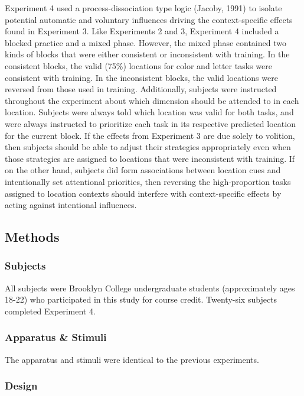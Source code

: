 \documentclass[english,,man,floatsintext]{apa6}
\begin{document}
Experiment 4 used a process-dissociation type logic (Jacoby, 1991) to
isolate potential automatic and voluntary influences driving the
context-specific effects found in Experiment 3. Like Experiments 2 and
3, Experiment 4 included a blocked practice and a mixed phase. However,
the mixed phase contained two kinds of blocks that were either
consistent or inconsistent with training. In the consistent blocks, the
valid (75\%) locations for color and letter tasks were consistent with
training. In the inconsistent blocks, the valid locations were reversed
from those used in training. Additionally, subjects were instructed
throughout the experiment about which dimension should be attended to in
each location. Subjects were always told which location was valid for
both tasks, and were always instructed to prioritize each task in its
respective predicted location for the current block. If the effects from
Experiment 3 are due solely to volition, then subjects should be able to
adjust their strategies appropriately even when those strategies are
assigned to locations that were inconsistent with training. If on the
other hand, subjects did form associations between location cues and
intentionally set attentional priorities, then reversing the
high-proportion tasks assigned to location contexts should interfere
with context-specific effects by acting against intentional influences.

\subsection{Methods}\label{methods-3}

\subsubsection{Subjects}\label{subjects-3}

All subjects were Brooklyn College undergraduate students (approximately
ages 18-22) who participated in this study for course credit. Twenty-six
subjects completed Experiment 4.

\subsubsection{Apparatus \& Stimuli}\label{apparatus-stimuli-3}

The apparatus and stimuli were identical to the previous experiments.

\subsubsection{Design}\label{design-3}
\end{document}

